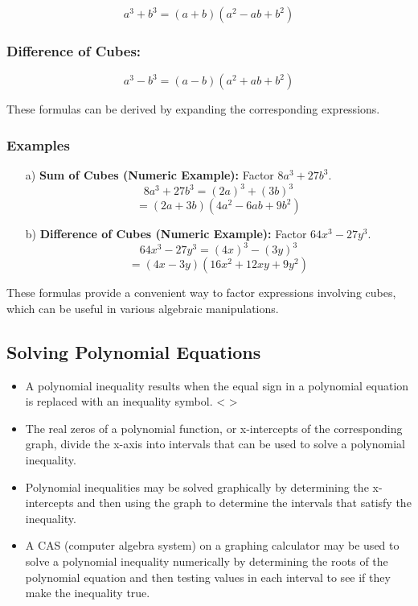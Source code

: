 \documentclass{article}
\begin{document}
\[ a^3 + b^3 = (a + b)(a^2 - ab + b^2) \]

\subsubsection*{Difference of Cubes:}

\[ a^3 - b^3 = (a - b)(a^2 + ab + b^2) \]

These formulas can be derived by expanding the corresponding expressions.

\subsubsection*{Examples}

\begin{enumerate}
    
    \item[a)] \textbf{Sum of Cubes (Numeric Example):} Factor \( 8a^3 + 27b^3 \).
    \[ 8a^3 + 27b^3 = (2a)^3 + (3b)^3 \]
    \[ = (2a + 3b)(4a^2 - 6ab + 9b^2) \]
    
    \item[b)] \textbf{Difference of Cubes (Numeric Example):} Factor \( 64x^3 - 27y^3 \).
    \[ 64x^3 - 27y^3 = (4x)^3 - (3y)^3 \]
    \[ = (4x - 3y)(16x^2 + 12xy + 9y^2) \]
\end{enumerate}

These formulas provide a convenient way to factor expressions involving cubes, which can be useful in various algebraic manipulations.
\newpage 
\subsection{Solving Polynomial Equations}
\begin{itemize}
    \item A polynomial inequality results when the equal sign in a polynomial equation is replaced
with an inequality symbol. < >
    \item The real zeros of a polynomial function, or x-intercepts of the corresponding graph, divide
the x-axis into intervals that can be used to solve a polynomial inequality.
    \item Polynomial inequalities may be solved graphically by determining the x-intercepts and
then using the graph to determine the intervals that satisfy the inequality.
    \item A CAS (computer algebra system) on a graphing calculator may be used to solve a polynomial inequality numerically by determining the roots of the polynomial equation and then testing values in each interval to see if they make the inequality true.
\end{itemize}
\end{document}
